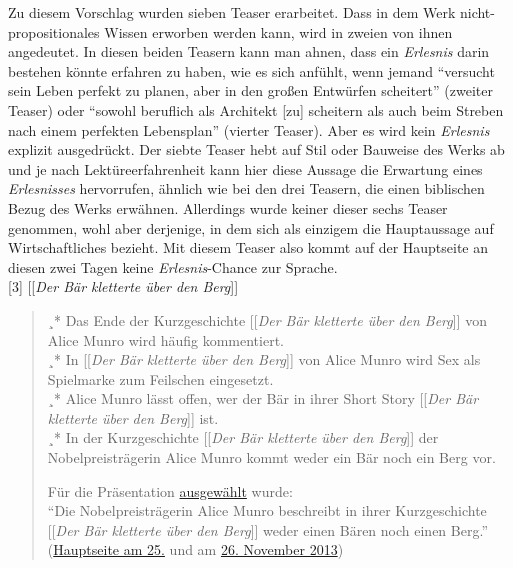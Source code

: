 \documentclass[fontsize=12pt]{scrartcl}
\begin{document}
Zu diesem Vorschlag wurden sieben Teaser erarbeitet. Dass in dem Werk nicht-pro\-po\-si\-ti\-o\-na\-les Wissen erworben werden kann, wird in zweien von ihnen angedeutet. In diesen beiden Teasern kann man ahnen, dass ein \textit{Erlesnis} darin bestehen k\"onnte erfahren zu haben, wie es sich anf\"uhlt, wenn jemand "`versucht sein Leben perfekt zu planen, aber in den gro{\ss}en Entw\"urfen scheitert"' (zweiter Teaser) oder "`sowohl be\-ruf\-lich als Architekt [zu] scheitern als auch beim Streben nach einem perfekten Le\-bens\-plan"' (vier\-ter Teaser). Aber es wird kein \textit{Erlesnis} explizit ausgedr\"uckt. Der siebte Teaser hebt auf Stil oder Bauweise des Werks ab und je nach Lekt\"ureerfahrenheit kann \mbox{hier} diese Aussage die Erwartung eines \textit{Erlesnisses} hervorrufen, \"ahnlich wie bei den drei Teasern, die einen biblischen Bezug des Werks erw\"ahnen. Al\-ler\-dings wurde keiner dieser sechs Teaser genommen, wohl aber derjenige, in dem sich als einzigem die Hauptaussage auf Wirtschaftliches bezieht. Mit diesem Teaser also kommt auf der Hauptseite an diesen zwei Tagen keine \textit{Erlesnis}-Chance zur Sprache.\\

[3] [[\textit{Der B\"ar kletterte \"uber den Berg}]]
\singlespacing
\begin{quote}
¸* Das Ende der Kurzgeschichte [[\textit{Der B\"ar kletterte \"uber den Berg}]] von Alice Munro wird h\"aufig kommentiert.\\
¸* In [[\textit{Der B\"ar kletterte \"uber den Berg}]] von Alice Munro wird Sex als Spielmarke zum Feilschen eingesetzt.\\
¸* Alice Munro l\"asst offen, wer der B\"ar in ihrer Short Story [[\textit{Der B\"ar kletterte \"uber den Berg}]] ist.\\
¸* In der Kurzgeschichte [[\textit{Der B\"ar kletterte \"uber den Berg}]] der Nobelpreistr\"agerin Alice Munro kommt weder ein B\"ar noch ein Berg vor.

F\"ur die Pr\"asentation \href{https://de.wikipedia.org/wiki/Wikipedia_Diskussion:Hauptseite/Schon_gewusst/Diskussionsarchiv/2013/Oktober#Vorschlag:_Der_B.C3.A4r_kletterte_.C3.BCber_den_Berg_.2820._Oktober_2013.29_.28erl..29}{ausgew\"ahlt} wurde:\\
"`Die Nobelpreistr\"agerin Alice Munro beschreibt in ihrer Kurzgeschichte [[\textit{Der B\"ar kletterte \"uber den Berg}]] weder einen B\"aren noch einen Berg."' (\href{https://de.wikipedia.org/wiki/Wikipedia:Hauptseite/Archiv/25._November_2013}{Hauptseite am 25.} und am \href{https://de.wikipedia.org/wiki/Wikipedia:Hauptseite/Archiv/26._November_2013}{26. November 2013})
\end{quote}
\onehalfspacing
\end{document}
